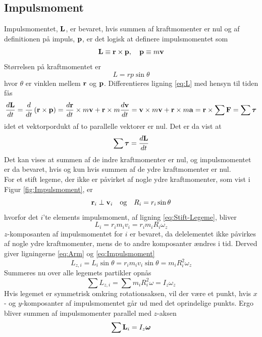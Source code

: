 \subsection{Impulsmoment}
Impulsmomentet, $\mathbf{L}$, er bevaret, hvis summen af kraftmomenter er nul og af definitionen på impuls, $\mathbf{p}$, er det logisk at definere impulsmomentet som
\begin{equation} \label{eq:L}
    \mathbf{L} \equiv \mathbf{r}\times\mathbf{p}, \quad \mathbf{p} \equiv m\mathbf{v}
\end{equation}
Størrelsen på kraftmomentet er
\begin{equation}
L=rp\sin\theta
\end{equation}
hvor $\theta$ er vinklen mellem $\mathbf{r}$ og $\mathbf{p}$. Differentieres ligning \ref{eq:L} med hensyn til tiden fås
\begin{equation}
    {d{\ensuremath{\mathbf{L}}} \over d{t}} = {d{} \over d{t}}\left(\mathbf{r}\times\mathbf{p}\right) = {d{\mathbf{r}} \over d{t}}\times m\mathbf{v}+\mathbf{r}\times m{d{\mathbf{v}} \over d{t}} = \mathbf{v}\times m\mathbf{v}+\mathbf{r}\times m\mathbf{a} = \mathbf{r}\times\sum\mathbf{F} = \sum\mbox{\boldmath$ \tau $}
\end{equation}
idet et vektorpordukt af to parallelle vektorer er nul. Det er da vist at
\begin{equation}
    \sum\mbox{\boldmath$ \tau $} = {d{\mathbf{L}} \over d{t}}
\end{equation}
Det kan vises at summen af de indre kraftmomenter er nul, og impulsmomentet er da bevaret, hvis og kun hvis summen af de ydre kraftmomenter er nul. \\

For et stift legeme, der ikke er påvirket af nogle ydre kraftmomenter, som vist i Figur \ref{fig:Impulsmoment}, er
\begin{equation} \label{eq:Arm}
    \mathbf{r}_i\perp\mathbf{v}_i \quad\text{og}\quad R_i=r_i\sin\theta
\end{equation}
hvorfor det $i$'te elements impulsmoment, af ligning \ref{eq:Stift-Legeme}, bliver
\begin{equation} \label{eq:Impulsmoment}
    L_{i} = r_im_iv_i = r_im_iR_i\omega_z
\end{equation}
$z$-komposanten af impulsmomentet for $i$ er bevaret, da delelementet ikke påvirkes af nogle ydre kraftmomenter, mens de to andre komposanter ændres i tid. Derved giver ligningerne \ref{eq:Arm} og \ref{eq:Impulsmoment}
\begin{equation}
     L_{z,i}=L_i\sin\theta=r_im_iv_i\sin\theta=m_iR_i^2\omega_z
\end{equation}
Summeres nu over alle legemets partikler opnås
\begin{equation}
    \sum L_{z,i}=\sum m_iR_i^2\omega=I_z\omega_z
\end{equation}
Hvis legemet er symmetrisk omkring rotationsaksen, vil der være et punkt, hvis $x$- og $y$-komposanter af impulsmomentet går ud med det oprindelige punkts. Ergo bliver summen af impulsmomenter parallel med $z$-aksen
\begin{equation}
    \sum\mathbf{L}_i = I_z\mbox{\boldmath$ \omega $}
\end{equation}

